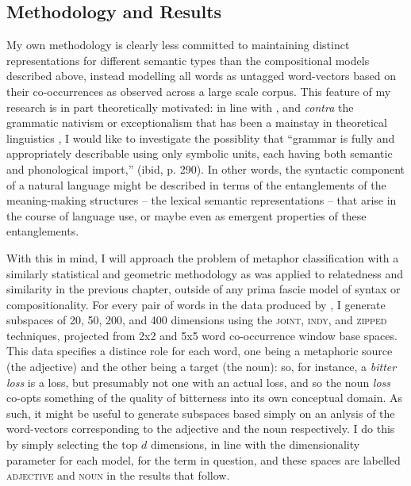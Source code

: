 
\subsection{Methodology and Results}
My own methodology is clearly less committed to maintaining distinct representations for different semantic types than the compositional models described above, instead modelling all words as untagged word-vectors based on their co-occurrences as observed across a large scale corpus.  This feature of my research is in part theoretically motivated: in line with \cite{Langacker1991}, and \emph{contra} the grammatic nativism or exceptionalism that has been a mainstay in theoretical linguistics \citep{Chomsky}, I would like to investigate the possiblity that ``grammar is fully and appropriately describable using only symbolic units, each having both semantic and phonological import,'' (ibid, p. 290).  In other words, the syntactic component of a natural language might be described in terms of the entanglements of the meaning-making structures -- the lexical semantic representations -- that arise in the course of language use, or maybe even as emergent properties of these entanglements.

With this in mind, I will approach the problem of metaphor classification with a similarly statistical and geometric methodology as was applied to relatedness and similarity in the previous chapter, outside of any prima fascie model of syntax or compositionality.  For every pair of words in the data produced by \cite{GutierrezEA2016}, I generate subspaces of 20, 50, 200, and 400 dimensions using the \textsc{joint}, \textsc{indy}, and \textsc{zipped} techniques, projected from 2x2 and 5x5 word co-occurrence window base spaces.  This data specifies a distince role for each word, one being a metaphoric source (the adjective) and the other being a target (the noun): so, for instance, a \emph{bitter loss} is a loss, but presumably not one with an actual loss, and so the noun \emph{loss} co-opts something of the quality of bitterness into its own conceptual domain.  As such, it might be useful to generate subspaces based simply on an anlysis of the word-vectors corresponding to the adjective and the noun respectively.  I do this by simply selecting the top $d$ dimensions, in line with the dimensionality parameter for each model, for the term in question, and these spaces are labelled \textsc{adjective} and \textsc{noun} in the results that follow.

